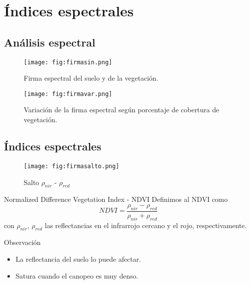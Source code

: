\section{Índices espectrales}
\subsection{Análisis espectral}

\begin{frame}{}
  \begin{figure}
    \centering
    \texttt{[image: fig:firmasin.png]}
    \caption{Firma espectral del suelo y de la vegetación.}
    \label{}
  \end{figure}
\end{frame}

\begin{frame}{}
  \begin{figure}
    \centering
    \texttt{[image: fig:firmavar.png]}
    \caption{Variación de la firma espectral según porcentaje de cobertura de vegetación.}
    \label{}
  \end{figure}
\end{frame}

\subsection{Índices espectrales}

\begin{frame}{}
  \begin{figure}
    \centering
    \texttt{[image: fig:firmasalto.png]}
    \caption{Salto $\rho_{nir}$ - $\rho_{red}$}
    \label{}
  \end{figure}
\end{frame}


\begin{frame}{}
\begin{block}{Normalized Difference Vegetation Index - NDVI}
  Definimos al NDVI como
  \begin{equation}
    NDVI = \frac{\rho_{nir}-\rho_{red}}{\rho_{nir}+\rho_{red}}
  \end{equation}
  con $\rho_{nir}$, $\rho_{red}$ las reflectancias en el infrarrojo cercano y el rojo, respectivamente.
\end{block}
\begin{block}{Observación}
    \begin{itemize}[<+->]
        \item La reflectancia del suelo lo puede afectar.
        \item Satura cuando el canopeo es muy denso.
    \end{itemize}
\end{block}
\end{frame}

